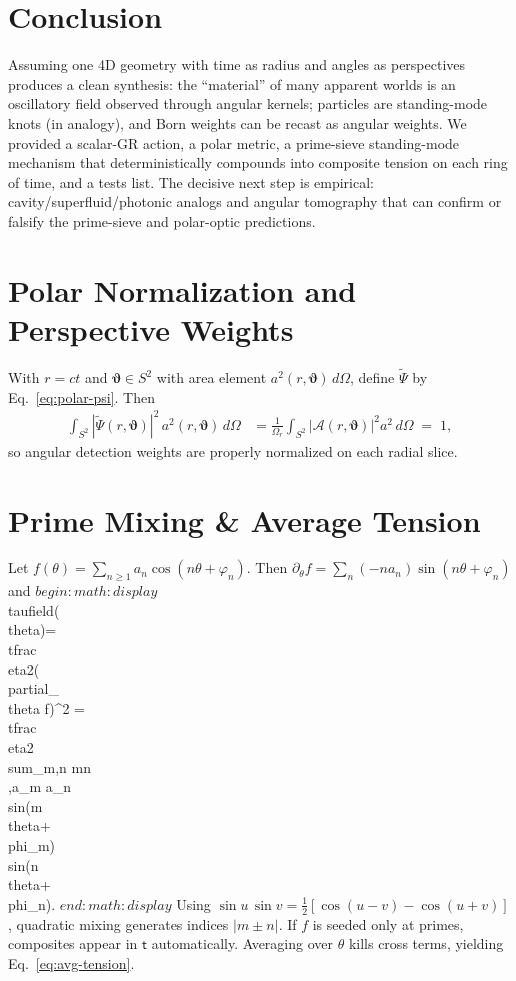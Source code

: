 \documentclass[reprint,amsmath,amssymb,aps]{revtex4-2}
\newcommand{\A}{\mathcal{A}}                   %
\newcommand{\angb}{\boldsymbol{\vartheta}}     %
\newcommand{\taufield}{\mathsf{t}}             %
\begin{document}
\section{Conclusion}
Assuming one 4D geometry with time as radius and angles as perspectives produces a clean synthesis: the “material” of many apparent worlds is an oscillatory field observed through angular kernels; particles are standing-mode knots (in analogy), and Born weights can be recast as angular weights. We provided a scalar-GR action, a polar metric, a prime-sieve standing-mode mechanism that deterministically compounds into composite tension on each ring of time, and a tests list. The decisive next step is empirical: cavity/superfluid/photonic analogs and angular tomography that can confirm or falsify the prime-sieve and polar-optic predictions.

\appendix

\section{Polar Normalization and Perspective Weights}\label{app:polar}
With $r=ct$ and $\angb\in S^2$ with area element $a^2(r,\angb)\,d\Omega$, define $\tilde{\Psi}$ by Eq.~\eqref{eq:polar-psi}. Then
\begin{align}
 \int_{S^2} |\tilde{\Psi}(r,\angb)|^2\, a^2(r,\angb)\, d\Omega
 &= \frac{1}{\Omega_r}\int_{S^2} |\A(r,\angb)|^2 a^2\, d\Omega \;=\; 1,
\end{align}
so angular detection weights are properly normalized on each radial slice.

\section{Prime Mixing \& Average Tension}\label{app:primeproof}
Let $f(\theta)=\sum_{n\ge1} a_n \cos(n\theta+\varphi_n)$. Then
$\partial_\theta f=\sum_n (-n a_n)\sin(n\theta+\varphi_n)$ and
$begin:math:display$
\\taufield(\\theta)=\\tfrac{\\eta}{2}(\\partial_\\theta f)^2
= \\tfrac{\\eta}{2}\\sum_{m,n} mn\\,a_m a_n \\sin(m\\theta+\\phi_m)\\sin(n\\theta+\\phi_n).
$end:math:display$
Using $\sin u\,\sin v=\tfrac{1}{2}[\cos(u{-}v)-\cos(u{+}v)]$, quadratic mixing generates indices $|m\pm n|$. If $f$ is seeded only at primes, composites appear in $\taufield$ automatically. Averaging over $\theta$ kills cross terms, yielding Eq.~\eqref{eq:avg-tension}.
\end{document}

